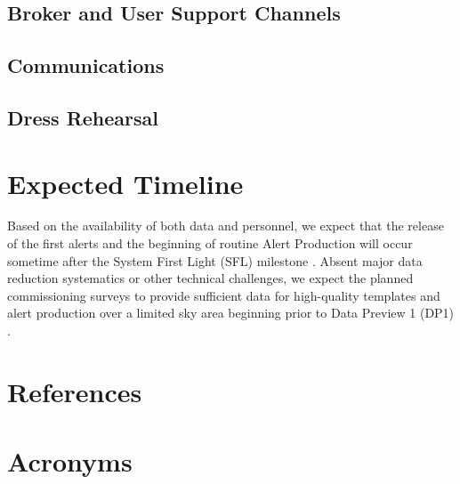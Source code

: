 \documentclass[OPS,authoryear,toc]{lsstdoc}
\begin{document}

\subsection{Broker and User Support Channels}

\subsection{Communications}

\subsection{Dress Rehearsal}


\section{Expected Timeline}

Based on the availability of both data and personnel, we expect that the release of the first alerts and the beginning of routine Alert Production will occur sometime after the System First Light (SFL) milestone .
Absent major data reduction systematics or other technical challenges, we expect the planned commissioning surveys to provide sufficient data for high-quality templates and alert production over a limited sky area beginning prior to Data Preview 1 (DP1) .



\appendix
\section{References} \label{sec:bib}
\renewcommand{\refname}{} %


\section{Acronyms} \label{sec:acronyms}

\end{document}
